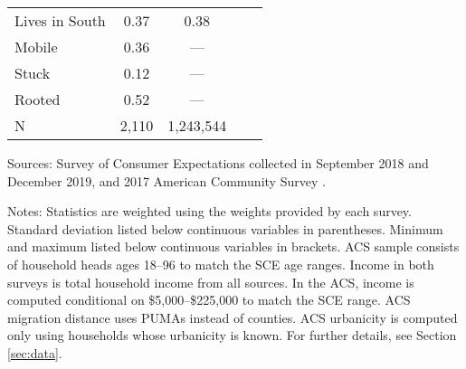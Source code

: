 \begin{table}[ht]
\begin{footnotesize}
\begin{threeparttable}
\begin{tabular}{lcccc}
Lives in South                            & 0.37                        & 0.38                            \\ 
Mobile                                    & 0.36                        & ---                                                   \\ 
Stuck                                     & 0.12                        & ---                                                   \\ 
Rooted                                    & 0.52                        & ---                                                   \\ 
\midrule 
N                                         &      2,110                         &  1,243,544                             \\ 
\bottomrule 
\end{tabular} 
\footnotesize{Sources: Survey of Consumer Expectations collected in September 2018 and December 2019, and 2017 American Community Survey \citep{IPUMS2019}. 
 
Notes: Statistics are weighted using the weights provided by each survey. Standard deviation listed below continuous variables in parentheses. Minimum and maximum listed below continuous variables in brackets. ACS sample consists of household heads ages 18--96 to match the SCE age ranges. Income in both surveys is total household income from all sources. In the ACS, income is computed conditional on \$5,000--\$225,000 to match the SCE range. ACS migration distance uses PUMAs instead of counties. ACS urbanicity is computed only using households whose urbanicity is known. For further details, see Section \ref{sec:data}.}
\end{threeparttable} 
\end{footnotesize} 
\end{table} 
